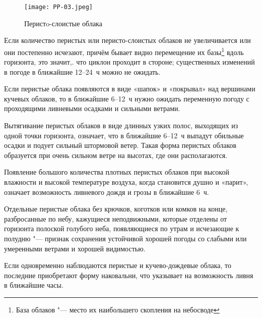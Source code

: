 

\begin{figure}[htb]
  \centering{}
  \texttt{[image: PP-03.jpeg]}
  \caption{Перистo-слоистые облака}
  \label{fig:pp03}
  \small
  \centering{}
\end{figure}

 Если количество перистых или перисто-слоистых облаков не
увеличивается или они постепенно исчезают, причём бывает видно
перемещение их базы\footnote{База облаков "--- место их наибольшего
  скопления на небосводе} вдоль горизонта, это значит,. что циклон
проходит в стороне; существенных изменений в погоде в ближайшие
12--24~ч можно не ожидать.

 Если перистые облака появляются в виде «шапок» и «покрывал» над
вершинами кучевых облаков, то в ближайшие 6--12~ч нужно ожидать
переменную погоду с проходящими ливневыми осадками и сильными ветрами.

 Вытягивание перистых облаков в виде длинных узких полос, выходящих
из одной точки горизонта, означает, что в ближайшие 6--12~ч выпадут
обильные осадки и подует сильный штормовой ветер. Такая форма перистых
облаков образуется при очень сильном ветре на высотах, где они
располагаются.

 Появление большого количества плотных перистых облаков при
высокой влажности и высокой температуре воздуха, когда становится
душно и «парит», означает возможность ливневого дождя и грозы в
ближайшие 6~ч.

 Отдельные перистые облака без крючков, коготков или комков на
конце, разбросанные по небу, кажущиеся неподвижными, которые отделены
от горизонта полоской голубого неба, появляющиеся по утрам и
исчезающие к полудню "--- признак сохранения устойчивой хорошей погоды
со слабыми или умеренными ветрами и хорошей видимостью.

 Если одновременно наблюдаются перистые и кучево-дождевые
облака, то последние приобретают форму наковальни, что указывает на
возможность ливня в ближайшие часы.

